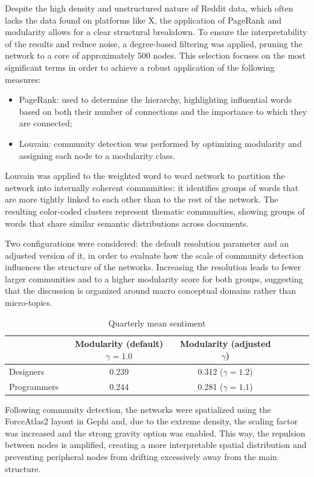 \documentclass[conference]{IEEEtran}
\begin{document}
Despite the high density and unstructured nature of Reddit data, which often lacks the data found on platforms like X, the application of PageRank and modularity allows for a clear structural breakdown. To ensure the interpretability of the results and reduce noise, a degree-based filtering was applied, pruning the network to a core of approximately 500 nodes. This selection focuses on the most significant terms in order to achieve a robust application of the following measures:
\begin{itemize}
    \item PageRank: used to determine the hierarchy, highlighting influential words based on both their number of connections and the importance to which they are connected;
    \item Louvain: community detection was performed by optimizing modularity and assigning each node to a modularity class.
\end{itemize}
Louvain was applied to the weighted word to word network to partition the network into internally coherent communities: it identifies groups of words that are more tightly linked to each other than to the rest of the network. The resulting color-coded clusters represent thematic communities, showing groups of words that share similar semantic distributions across documents.

Two configurations were considered: the default resolution parameter and an adjusted version of it, in order to evaluate how the scale of community detection influences the structure of the networks. Increasing the resolution leads to fewer larger communities and to a higher modularity score for both groups, suggesting that the discussion is organized around macro conceptual domains rather than micro-topics.
\begin{table}[H]
    \centering
    \caption{Quarterly mean sentiment}
    \label{tab:quarter_mean_sentiment}
    \begin{tabular}{l c c c c c c}
        \hline
        & Modularity (default) $\gamma = 1.0$ & Modularity (adjusted $\gamma$) \\
        \hline
        Designers & 0.239 & 0.312 ($\gamma = 1.2$) \\
        Programmers & 0.244 & 0.281 ($\gamma = 1.1$) \\
        \hline
    \end{tabular}
\end{table}
Following community detection, the networks were spatialized using the ForceAtlas2 layout in Gephi and, due to the extreme density, the scaling factor was increased and the strong gravity option was enabled. This way, the repulsion between nodes is amplified, creating a more interpretable spatial distribution and preventing peripheral nodes from drifting excessively away from the main structure.
\end{document}
